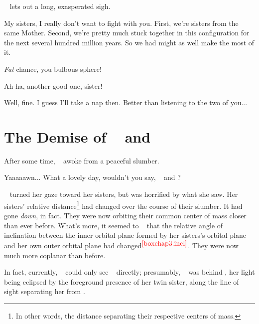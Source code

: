\documentclass[main.tex]{subfiles}
\begin{document}
\par \nar \rmcelaeno~ lets out a long, exasperated sigh.

\par \Celaeno My sisters, I really don't want to fight with you.  First, we're sisters from the same Mother.  Second, we're pretty much stuck together in this configuration for the next several hundred million years.  So we had might as well make the most of it.

\par \Taygete \textit{Fat} chance, you bulbous sphere!

\par \Alcyone Ah ha, another good one, sister!

\par \Celaeno Well, fine.  I guess I'll take a nap then.  Better than listening to the two of you...

\section{The Demise of \rmtaygete~ and \rmalcyone}

\par \nar After some time, \rmcelaeno~ awoke from a peaceful slumber.  

\par \Celaeno Yaaaaawn... What a lovely day, wouldn't you say, \rmtaygete~ and \rmalcyone?

\par \nar \rmcelaeno~ turned her gaze toward her sisters, but was horrified by what she saw.  Her sisters' relative distance\footnote{In other words, the distance separating their respective centers of mass.} had changed over the course of their slumber.  It had gone \textit{down}, in fact.  They were now orbiting their common center of mass closer than ever before.  What's more, it seemed to \rmcelaeno~ that the relative angle of inclination between the inner orbital plane formed by her sisters's orbital plane and her own outer orbital plane had changed$^{\textcolor{red}{\ref{boxchap3:incl}}}$.  They were now much more coplanar than before.


\par \nar  In fact, currently, \rmcelaeno~ could only see \rmalcyone~ directly; presumably, \rmtaygete~ was behind \rmalcyone, her light being eclipsed by the foreground presence of her twin sister, along the line of sight separating her from \rmcelaeno.
\end{document}
